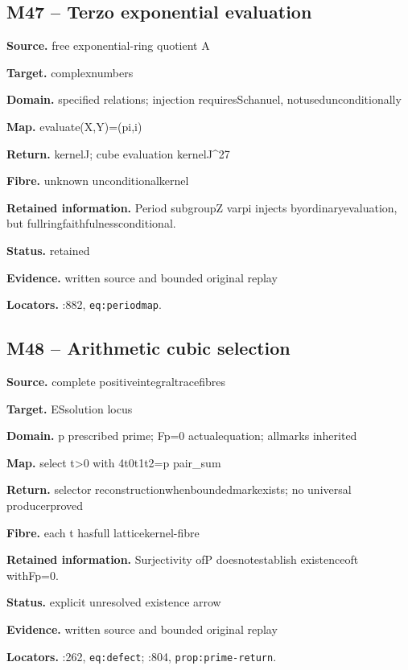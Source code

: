 \subsection*{M47 -- Terzo exponential evaluation}
\noindent\textbf{Source.} free exponential-ring quotient A\par
\noindent\textbf{Target.} complexnumbers\par
\noindent\textbf{Domain.} specified relations; injection requiresSchanuel, notusedunconditionally\par
\noindent\textbf{Map.} evaluate(X,Y)=(pi,i)\par
\noindent\textbf{Return.} kernelJ; cube evaluation kernelJ\textasciicircum{}27\par
\noindent\textbf{Fibre.} unknown unconditionalkernel\par
\noindent\textbf{Retained information.} Period subgroupZ varpi injects byordinaryevaluation, but fullringfaithfulnessconditional.\par
\noindent\textbf{Status.} retained\par
\noindent\textbf{Evidence.} written source and bounded original replay\par
\noindent\textbf{Locators.} :882, \texttt{eq:periodmap}.
\subsection*{M48 -- Arithmetic cubic selection}
\noindent\textbf{Source.} complete positiveintegraltracefibres\par
\noindent\textbf{Target.} ESsolution locus\par
\noindent\textbf{Domain.} p prescribed prime; Fp=0 actualequation; allmarks inherited\par
\noindent\textbf{Map.} select t>0 with 4t0t1t2=p pair\_sum\par
\noindent\textbf{Return.} selector reconstructionwhenboundedmarkexists; no universal producerproved\par
\noindent\textbf{Fibre.} each t hasfull latticekernel-fibre\par
\noindent\textbf{Retained information.} Surjectivity ofP doesnotestablish existenceoft withFp=0.\par
\noindent\textbf{Status.} explicit unresolved existence arrow\par
\noindent\textbf{Evidence.} written source and bounded original replay\par
\noindent\textbf{Locators.} :262, \texttt{eq:defect}; :804, \texttt{prop:prime-return}.

